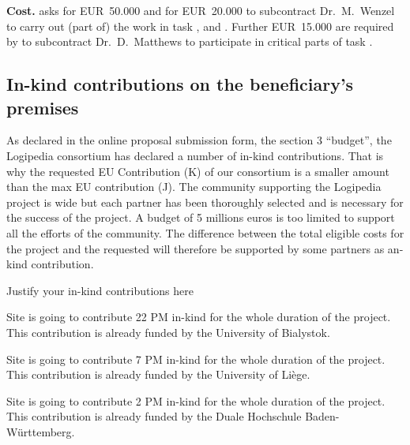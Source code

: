 {\bf Cost.}  asks for
EUR~50.000 and  for EUR~20.000 to subcontract Dr.\ M.\ Wenzel to
carry out (part of) the work in task
,  and
. Further EUR~15.000 are required
by  to subcontract Dr.\ D.\ Matthews to participate in
critical parts of task .

\subsection{In-kind contributions on the beneficiary’s premises}

As declared in the online proposal submission form, the section 3
``budget'', the Logipedia consortium has declared a number of in-kind
contributions. That is why the requested EU Contribution (K) of our
consortium is a smaller amount than the max EU contribution (J). The
community supporting the Logipedia project is wide but each partner
has been thoroughly selected and is necessary for the success of the
project. A budget of 5 millions euros is too limited to support all
the efforts of the community. The difference between the total
eligible costs for the project and the requested will therefore be
supported by some partners as an-kind contribution.

{\color{red} Justify your in-kind contributions here}

Site  is going to contribute 22 PM in-kind for the whole duration of the project.
This contribution is already funded by the University of Bialystok.

Site  is going to contribute 7 PM in-kind for the whole duration of the project.
This contribution is already funded by the University of Liège.

Site  is going to contribute 2 PM in-kind for the whole duration of the project.
This contribution is already funded by the Duale Hochschule Baden-Württemberg.



